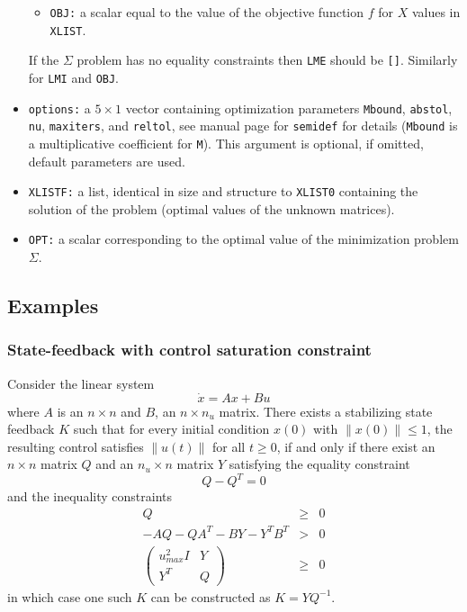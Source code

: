 \documentclass{article}
\begin{document}
\begin{itemize}
\begin{itemize}
\item {\tt OBJ:} a scalar equal to the value of the objective function $f$
for $X$ values in {\tt XLIST}.
\end{itemize}
If the $\Sigma$ problem has no equality constraints then {\tt LME}
should be {\tt []}. Similarly for {\tt LMI} and {\tt OBJ}.

\item
{\tt options:} a $5 \times 1$ vector containing optimization
parameters {\tt Mbound}, {\tt abstol}, {\tt nu}, {\tt maxiters},
and {\tt reltol}, see  manual page for {\tt semidef} for details ({\tt Mbound}
is a multiplicative coefficient for {\tt M}). This argument is optional,
if omitted, default parameters are used.


\item {\tt XLISTF:} a list, identical in size and structure to {\tt XLIST0}
containing the solution of the problem (optimal values of the unknown matrices).

\item {\tt OPT:} a scalar corresponding to the optimal value of the minimization
problem $\Sigma$.
\end{itemize}

\subsection{Examples}
\subsubsection{State-feedback with control saturation constraint}
\label{ex1}
Consider the linear system
\[
\dot{x}=Ax+Bu   
\]
where $A$ is an $n\times n$ and $B$, an $n \times n_u$ matrix.
There exists a stabilizing state feedback $K$ 
such that for every initial condition $x(0)$ with $\| x(0)\| \leq 1$,
the resulting control satisfies $\| u(t)\|$ for all $t\geq 0$, if and only if
there exist an $n\times n$ matrix $Q$ and an
$n_u \times n$ matrix $Y$ satisfying the equality constraint
\[
Q-Q^T=0
\]
and the inequality constraints
\begin{eqnarray*}
Q&\geq&0\\
-AQ-QA^T-BY-Y^TB^T &>& 0 \\
\left( \begin{array} {cc}  u_{max}^2I &Y\\Y^T & Q \end{array} \right) &\geq & 0
\end{eqnarray*}
in which case one such $K$ can be constructed as $K=YQ^{-1}$.
\end{document}
